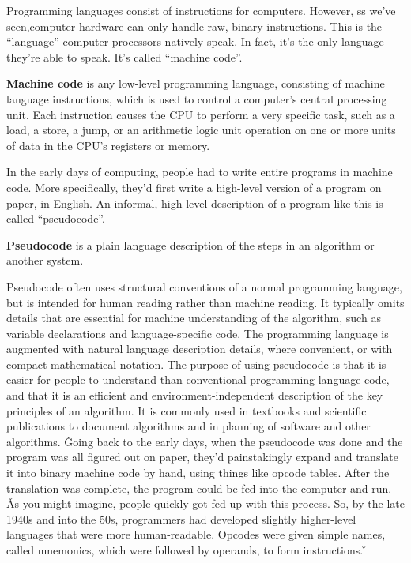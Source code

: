 Programming languages consist of instructions for computers. However, ss we've seen,computer hardware can only handle
raw, binary instructions. This is the ``language'' computer processors natively speak. In fact, it's the only
language they're able to speak. It's called ``machine code''.

\textbf{Machine code} is any low-level programming language, consisting of machine language instructions, which is
used to control a computer's central processing unit. Each instruction causes the CPU to perform a very specific
task, such as a load, a store, a jump, or an arithmetic logic unit operation on one or more units of data in the
CPU's registers or memory.
\ed

In the early days of computing, people had to write entire programs in machine code. More specifically, they'd first
write a high-level version of a program on paper, in English. An informal, high-level description of a program like
this is called ``pseudocode''.

\bd[Pseudocode]
\textbf{Pseudocode} is a plain language description of the steps in an algorithm or another system.
\ed

Pseudocode often uses structural conventions of a normal programming language, but is intended for human reading
rather than machine reading. It typically omits details that are essential for machine understanding of the
algorithm, such as variable declarations and language-specific code. The programming language is augmented with
natural language description details, where convenient, or with compact mathematical notation. The purpose of using
pseudocode is that it is easier for people to understand than conventional programming language code, and that it is
an efficient and environment-independent description of the key principles of an algorithm. It is commonly used in
textbooks and scientific publications to document algorithms and in planning of software and other algorithms. \v

Going back to the early days, when the pseudocode was done and the program was all figured out on paper, they'd
painstakingly expand and translate it into binary machine code by hand, using things like opcode tables. After the
translation was complete, the program could be fed into the computer and run. \v

As you might imagine, people quickly got fed up with this process. So, by the late 1940s and into the 50s,
programmers had developed slightly higher-level languages that were more human-readable. Opcodes were given simple
names, called mnemonics, which were followed by operands, to form instructions. \v

